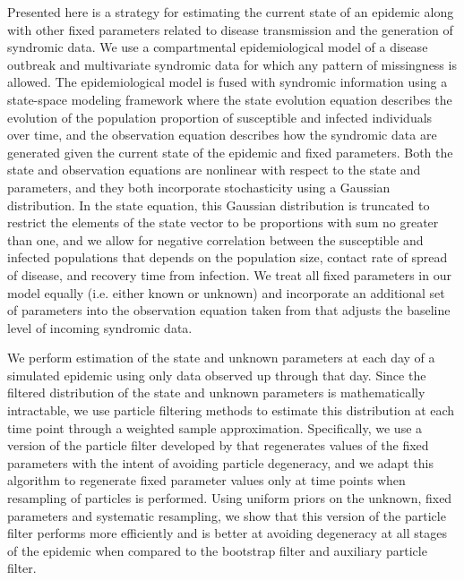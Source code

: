 
Presented here is a strategy for estimating the current state of an epidemic along with other fixed parameters related to disease transmission and the generation of syndromic data. We use a compartmental epidemiological model of a disease outbreak and multivariate syndromic data for which any pattern of missingness is allowed. The epidemiological model is fused with syndromic information using a state-space modeling framework where the state evolution equation describes the evolution of the population proportion of susceptible and infected individuals over time, and the observation equation describes how the syndromic data are generated given the current state of the epidemic and fixed parameters. Both the state and observation equations are nonlinear with respect to the state and parameters, and they both incorporate stochasticity using a Gaussian distribution. In the state equation, this Gaussian distribution is truncated to restrict the elements of the state vector to be proportions with sum no greater than one, and we allow for negative correlation between the susceptible and infected populations that depends on the population size, contact rate of spread of disease, and recovery time from infection. We treat all fixed parameters in our model equally (i.e. either known or unknown) and incorporate an additional set of parameters into the observation equation taken from \citet{skvortsov2012monitoring} that adjusts the baseline level of incoming syndromic data.

We perform estimation of the state and unknown parameters at each day of a simulated epidemic using only data observed up through that day. Since the filtered distribution of the state and unknown parameters is mathematically intractable, we use particle filtering methods to estimate this distribution at each time point through a weighted sample approximation. Specifically, we use a version of the particle filter developed by \citet{Liu:West:comb:2001} that regenerates values of the fixed parameters with the intent of avoiding particle degeneracy, and we adapt this algorithm to regenerate fixed parameter values only at time points when resampling of particles is performed. Using uniform priors on the unknown, fixed parameters and systematic resampling, we show that this version of the particle filter performs more efficiently and is better at avoiding degeneracy at all stages of the epidemic when compared to the bootstrap filter and auxiliary particle filter.

